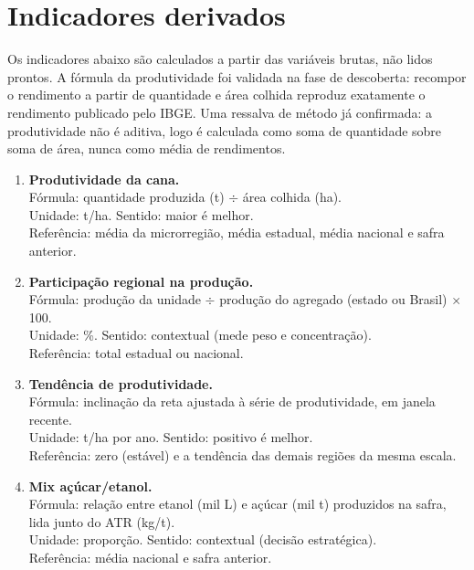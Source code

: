 \documentclass[11pt,a4paper]{article}
\begin{document}
\section{Indicadores derivados}

Os indicadores abaixo são calculados a partir das variáveis brutas, não lidos prontos. A
fórmula da produtividade foi validada na fase de descoberta: recompor o rendimento a partir de
quantidade e área colhida reproduz exatamente o rendimento publicado pelo IBGE. Uma ressalva de
método já confirmada: a produtividade não é aditiva, logo é calculada como soma de quantidade
sobre soma de área, nunca como média de rendimentos.

\begin{enumerate}
  \item \textbf{Produtividade da cana.}
  \\ Fórmula: quantidade produzida (t) $\div$ área colhida (ha).
  \\ Unidade: t/ha. \quad Sentido: maior é melhor.
  \\ Referência: média da microrregião, média estadual, média nacional e safra anterior.

  \item \textbf{Participação regional na produção.}
  \\ Fórmula: produção da unidade $\div$ produção do agregado (estado ou Brasil) $\times$ 100.
  \\ Unidade: \%. \quad Sentido: contextual (mede peso e concentração).
  \\ Referência: total estadual ou nacional.

  \item \textbf{Tendência de produtividade.}
  \\ Fórmula: inclinação da reta ajustada à série de produtividade, em janela recente.
  \\ Unidade: t/ha por ano. \quad Sentido: positivo é melhor.
  \\ Referência: zero (estável) e a tendência das demais regiões da mesma escala.

  \item \textbf{Mix açúcar/etanol.}
  \\ Fórmula: relação entre etanol (mil L) e açúcar (mil t) produzidos na safra, lida junto do
  ATR (kg/t).
  \\ Unidade: proporção. \quad Sentido: contextual (decisão estratégica).
  \\ Referência: média nacional e safra anterior.
\end{enumerate}
\end{document}
